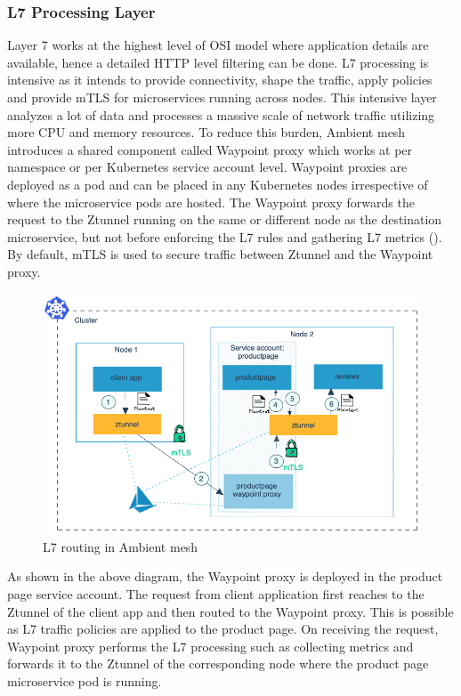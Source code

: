  \subsubsection{L7 Processing Layer}
 Layer 7 works at the highest level of OSI model where application details are available, hence a detailed HTTP level filtering can be done. L7 processing is intensive as it intends to provide connectivity, shape the traffic, apply policies and provide mTLS for microservices running across nodes. This intensive layer analyzes a lot of data and processes a massive scale of network traffic utilizing more CPU and memory resources. To reduce this burden, Ambient mesh introduces a shared component called Waypoint proxy which works at per namespace or per Kubernetes service account level. Waypoint proxies are deployed as a pod and can be placed in any Kubernetes nodes irrespective of where the microservice pods are hosted. The Waypoint proxy forwards the request to the Ztunnel running on the same or different node as the destination microservice, but not before enforcing the L7 rules and gathering L7 metrics (\cite{glooDocs}). By default, mTLS is used to secure traffic between Ztunnel and the Waypoint proxy.

 \begin{figure}[ht!]
    \centering
    \includegraphics[width=0.7\linewidth]{resources/ambient-routing-l7.png}
    \caption{L7 routing in Ambient mesh}
    \label{lr:waypointDesign}
 \end{figure}

 As shown in the above diagram, the Waypoint proxy is deployed in the product page service account. The request from client application first reaches to the Ztunnel of the client app and then routed to the Waypoint proxy. This is possible as L7 traffic policies are applied to the product page. On receiving the request, Waypoint proxy performs the L7 processing such as collecting metrics and forwards it to the Ztunnel of the corresponding node where the product page microservice pod is running.

